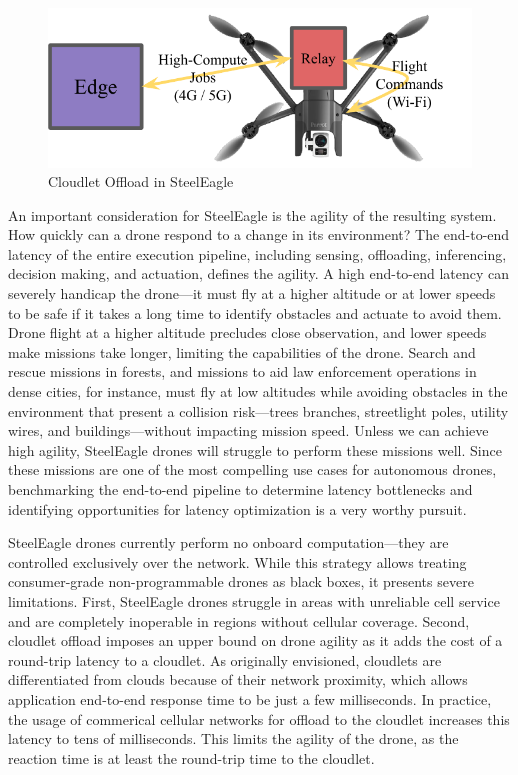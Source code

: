 \begin{figure}[htbp]
\centerline{\includegraphics[width = .6\textwidth]{figs/steeleagle-drone-arch-cropped.pdf}}
\caption{Cloudlet Offload in SteelEagle}
\label{fig:steeleagle-drone-arch}
\end{figure}

An important consideration for SteelEagle is the agility of the resulting
system.  How quickly can a drone respond to a change in its environment? The
end-to-end latency of the entire execution pipeline, including sensing,
offloading, inferencing, decision making, and actuation, defines the agility. A
high end-to-end latency can severely handicap the drone---it must fly at a
higher altitude or at lower speeds to be safe if it takes a long time to
identify obstacles and actuate to avoid them. Drone flight at a higher altitude
precludes close observation, and lower speeds make missions take longer,
limiting the capabilities of the drone. Search and rescue missions in forests,
and missions to aid law enforcement operations in dense cities, for instance,
must fly at low altitudes while avoiding obstacles in the environment that
present a collision risk---trees branches, streetlight poles, utility wires,
and buildings---without impacting mission speed. Unless we can achieve high
agility, SteelEagle drones will struggle to perform these missions well.  Since
these missions are one of the most compelling use cases for autonomous drones,
benchmarking the end-to-end pipeline to determine latency bottlenecks and
identifying opportunities for latency optimization is a very worthy pursuit.

SteelEagle drones currently perform no onboard computation---they are
controlled exclusively over the network.  While this strategy allows treating
consumer-grade non-programmable drones as black boxes, it presents severe
limitations. First, SteelEagle drones struggle in areas with unreliable cell
service and are completely inoperable in regions without cellular coverage.
Second, cloudlet offload imposes an upper bound on drone agility as it adds the
cost of a round-trip latency to a cloudlet. As originally envisioned, cloudlets
are differentiated from clouds because of their network proximity, which allows
application end-to-end response time to be just a few milliseconds. In
practice, the usage of commerical cellular networks for offload to the cloudlet
increases this latency to tens of milliseconds. This limits the agility of the
drone, as the reaction time is at least the round-trip time to the cloudlet.

